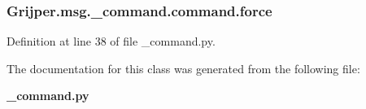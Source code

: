\subsubsection[{force}]{\setlength{\rightskip}{0pt plus 5cm}Grijper.\-msg.\-\_\-command.\-command.\-force}\label{classGrijper_1_1msg_1_1__command_1_1command_ac0320386dcdc95269f2afd2a9317195e}


Definition at line 38 of file \-\_\-command.\-py.



The documentation for this class was generated from the following file\-:\begin{DoxyCompactItemize}
\item 
{\bf \-\_\-command.\-py}\end{DoxyCompactItemize}
